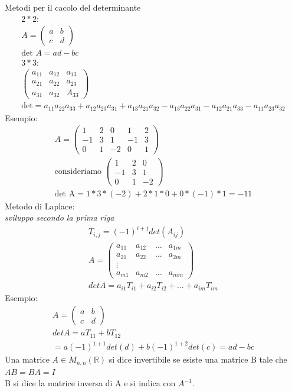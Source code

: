 \documentclass[a4paper,12pt]{article}
\begin{document}
Metodi per il cacolo del determinante
\begin{align*}
    2*2: \\
    A=\begin{pmatrix}
        a&b\\c&d
    \end{pmatrix} \\
    \text{det }A=ad-bc \\
    3*3: \\
    \begin{pmatrix}
        a_{11}&a_{12}&a_{13}\\a_{21}&a_{22}&a_{23}\\a_{31}&a_{32}&A_{33}
    \end{pmatrix} \\
    \text{det} = a_{11}a_{22}a_{33} + a_{12}a_{23}a_{31} + a_{13}a_{21}a_{32} - a_{13}a_{22}a_{31} - a_{12}a_{21}a_{33} - a_{11}a_{23}a_{32}
\end{align*}
Esempio:
\begin{align*}
    A=\begin{pmatrix}
        1&2&0&1&2\\-1&3&1&-1&3\\0&1&-2&0&1
    \end{pmatrix} \\
    \text{consideriamo }\begin{pmatrix}
        1&2&0\\-1&3&1\\0&1&-2
    \end{pmatrix} \\
    \text{det A}=1*3*(-2)+2*1*0+0*(-1)*1=-11
\end{align*}
Metodo di Laplace:
\\\textit{sviluppo secondo la prima riga}
\begin{align*}
    T_{i,j}=(-1)^{i+j}det(A_{ij})
    \\ A=\begin{pmatrix}
        a_{11}&a_{12}&\dots&a_{1m} \\
        a_{21}&a_{22}&\dots&a_{2m}\\
        \vdots \\
        a_{m1}&a_{m2}&\dots&a_{mm}
    \end{pmatrix}
    \\detA=a_{i1}T_{i1}+a_{i2}T_{i2}+\dots+a_{im}T_{im}
\end{align*}
Esempio:
\begin{align*}
    A=\begin{pmatrix}
        a&b\\c&d
    \end{pmatrix}
    \\detA=aT_{11}+bT_{12}
    \\=a(-1)^{1+1}det(d)+b(-1)^{1+2}det(c)=ad-bc
\end{align*}
Una matrice $A\in M_{n,n}(\mathbb{R})$ si dice invertibile se esiste una matrice B tale che $AB=BA=I$
\\B si dice la matrice inversa di A e si indica con $A^{-1}$.
\end{document}
